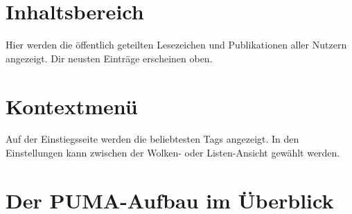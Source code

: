 \section{Inhaltsbereich}
\label{sec:inhaltsbereich}
Hier werden die öffentlich  geteilten Lesezeichen und Publikationen aller Nutzern angezeigt. Dir neusten Einträge erscheinen oben.
\section{Kontextmenü}
\label{sec:kontextmenue}
Auf der Einstiegsseite werden die beliebtesten Tags angezeigt. In den Einstellungen kann zwischen der Wolken- oder Listen-Ansicht gewählt werden.
\newpage
\section{Der PUMA-Aufbau im Überblick}
\label{sec:pumaAufbau}

